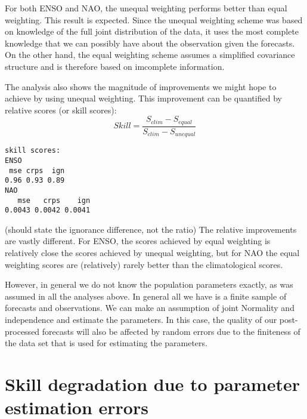 \documentclass[12pt]{article}
\begin{document}
For both ENSO and NAO, the unequal weighting performs better than equal weighting.
This result is expected. 
Since the unequal weighting scheme was based on knowledge of the full joint distribution of the data, it uses the most complete knowledge that we can possibly have about the observation given the forecasts.
On the other hand, the equal weighting scheme assumes a simplified covariance structure and is therefore based on imcomplete information.  

The analysis also shows the magnitude of improvements we might hope to achieve by using unequal weighting.
This improvement can be quantified by relative scores (or skill scores):
%
\begin{equation}
Skill = \frac{S_{clim} - S_{equal}}{S_{clim} - S_{unequal}}
\end{equation}
%
\begin{verbatim}
skill scores:
ENSO
 mse crps  ign 
0.96 0.93 0.89 
NAO
   mse   crps    ign 
0.0043 0.0042 0.0041 
\end{verbatim}

(should state the ignorance difference, not the ratio)
The relative improvements are vastly different.
For ENSO, the scores achieved by equal weighting is relatively close the scores achieved by unequal weighting, but for NAO the equal weighting scores are (relatively) rarely better than the climatological scores.

However, in general we do not know the population parameters exactly, as was assumed in all the analyses above.
In general all we have is a finite sample of forecasts and observations.
We can make an assumption of joint Normality and independence and estimate the parameters.
In this case, the quality of our post-processed forecasts will also be affected by random errors due to the finiteness of the data set that is used for estimating the parameters.

\section{Skill degradation due to parameter estimation errors}
\end{document}
